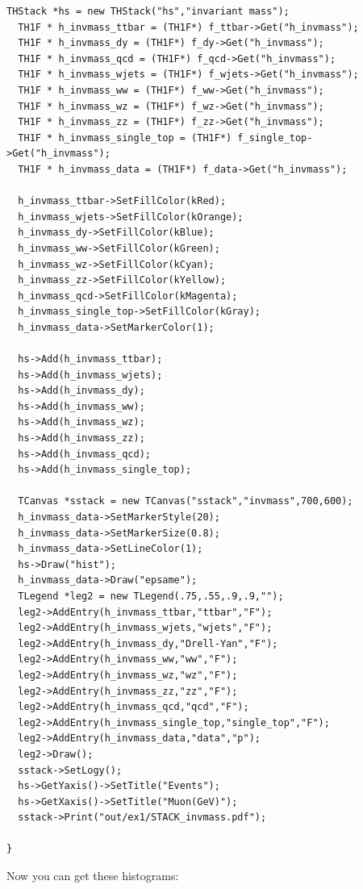 \documentclass[11pt]{article}
\begin{document}
\begin{lstlisting}[emph={if,while,continue,new},emphstyle=\color{nut}]
  THStack *hs = new THStack("hs","invariant mass");
  TH1F * h_invmass_ttbar = (TH1F*) f_ttbar->Get("h_invmass");
  TH1F * h_invmass_dy = (TH1F*) f_dy->Get("h_invmass");
  TH1F * h_invmass_qcd = (TH1F*) f_qcd->Get("h_invmass");
  TH1F * h_invmass_wjets = (TH1F*) f_wjets->Get("h_invmass");
  TH1F * h_invmass_ww = (TH1F*) f_ww->Get("h_invmass");
  TH1F * h_invmass_wz = (TH1F*) f_wz->Get("h_invmass");
  TH1F * h_invmass_zz = (TH1F*) f_zz->Get("h_invmass");
  TH1F * h_invmass_single_top = (TH1F*) f_single_top->Get("h_invmass");
  TH1F * h_invmass_data = (TH1F*) f_data->Get("h_invmass");

  h_invmass_ttbar->SetFillColor(kRed);
  h_invmass_wjets->SetFillColor(kOrange);
  h_invmass_dy->SetFillColor(kBlue);
  h_invmass_ww->SetFillColor(kGreen);
  h_invmass_wz->SetFillColor(kCyan);
  h_invmass_zz->SetFillColor(kYellow);
  h_invmass_qcd->SetFillColor(kMagenta);
  h_invmass_single_top->SetFillColor(kGray);
  h_invmass_data->SetMarkerColor(1);

  hs->Add(h_invmass_ttbar);
  hs->Add(h_invmass_wjets);
  hs->Add(h_invmass_dy);
  hs->Add(h_invmass_ww);
  hs->Add(h_invmass_wz);
  hs->Add(h_invmass_zz);
  hs->Add(h_invmass_qcd);
  hs->Add(h_invmass_single_top);

  TCanvas *sstack = new TCanvas("sstack","invmass",700,600);
  h_invmass_data->SetMarkerStyle(20);
  h_invmass_data->SetMarkerSize(0.8);
  h_invmass_data->SetLineColor(1);
  hs->Draw("hist");
  h_invmass_data->Draw("epsame");
  TLegend *leg2 = new TLegend(.75,.55,.9,.9,"");
  leg2->AddEntry(h_invmass_ttbar,"ttbar","F");
  leg2->AddEntry(h_invmass_wjets,"wjets","F");
  leg2->AddEntry(h_invmass_dy,"Drell-Yan","F");
  leg2->AddEntry(h_invmass_ww,"ww","F");
  leg2->AddEntry(h_invmass_wz,"wz","F");
  leg2->AddEntry(h_invmass_zz,"zz","F");
  leg2->AddEntry(h_invmass_qcd,"qcd","F");
  leg2->AddEntry(h_invmass_single_top,"single_top","F");
  leg2->AddEntry(h_invmass_data,"data","p");
  leg2->Draw();
  sstack->SetLogy();
  hs->GetYaxis()->SetTitle("Events");
  hs->GetXaxis()->SetTitle("Muon(GeV)");
  sstack->Print("out/ex1/STACK_invmass.pdf");

}

\end{lstlisting}
Now you can get these histograms:
\end{document}
